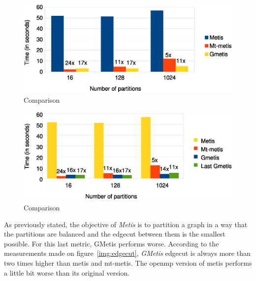 \documentclass[abstract=on,9pt,twocolumn]{scrartcl}
\begin{document}



\begin{center}
\begin{figure}[htb]
    \includegraphics[width=\columnwidth]{img/comparison3.eps}
    \caption{Comparison}
    \label{img:comparison3}
\end{figure}
\end{center}

\begin{center}
\begin{figure}[htb]
    \includegraphics[width=\columnwidth]{img/comparison4.eps}
    \caption{Comparison}
    \label{img:comparison4}
\end{figure}
\end{center}

As previously stated, the objective of \textit{Metis} is to partition a graph in a way
that the partitions are balanced and the edgecut between them is the smallest
possible. For this last metric, GMetis performs worse. According to the
measurements made on figure~\ref{img:edgecut}, \textit{GMetis} edgecut is
always more than two times higher than metis and mt-metis. The openmp
version of metis performs a little bit worse than its original version.
\end{document}
